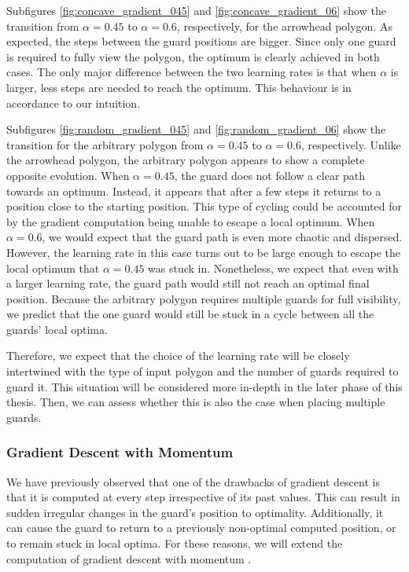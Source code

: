 Subfigures \ref{fig:concave_gradient_045} and \ref{fig:concave_gradient_06} show the transition from $\alpha = 0.45$ to $\alpha = 0.6$, respectively, for the arrowhead polygon. As expected, the steps between the guard positions are bigger. Since only one guard is required to fully view the polygon, the optimum is clearly achieved in both cases. The only major difference between the two learning rates is that when $\alpha$ is larger, less steps are needed to reach the optimum. This behaviour is in accordance to our intuition.

Subfigures \ref{fig:random_gradient_045} and \ref{fig:random_gradient_06} show the transition for the arbitrary polygon from $\alpha = 0.45$ to $\alpha = 0.6$, respectively. Unlike the arrowhead polygon, the arbitrary polygon appears to show a complete opposite evolution. When $\alpha = 0.45$, the guard does not follow a clear path towards an optimum. Instead, it appears that after a few steps it returns to a position close to the starting position. This type of cycling could be accounted for by the gradient computation being unable to escape a local optimum. When $\alpha = 0.6$, we would expect that the guard path is even more chaotic and dispersed. However, the learning rate in this case turns out to be large enough to escape the local optimum that $\alpha = 0.45$ was stuck in. Nonetheless, we expect that even with a larger learning rate, the guard path would still not reach an optimal final position. Because the arbitrary polygon requires multiple guards for full visibility, we predict that the one guard would still be stuck in a cycle between all the guards' local optima.

Therefore, we expect that the choice of the learning rate will be closely intertwined with the type of input polygon and the number of guards required to guard it. This situation will be considered more in-depth in the later phase of this thesis. Then, we can assess whether this is also the case when placing multiple guards.

\subsubsection{Gradient Descent with Momentum}
We have previously observed that one of the drawbacks of gradient descent is that it is computed at every step irrespective of its past values. This can result in sudden irregular changes in the guard's position to optimality. Additionally, it can cause the guard to return to a previously non-optimal computed position, or to remain stuck in local optima. For these reasons, we will extend the computation of gradient descent with momentum \cite{goodfelow2016deep}.


